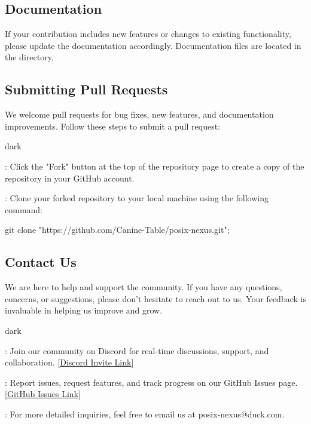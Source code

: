 \subsection{Documentation}
\label{sec:introduction:sub:document}
If your contribution includes new features or changes to existing functionality, please update the documentation accordingly.
Documentation files are located in the  directory.

\subsection{Submitting Pull Requests}
\label{sec:introduction:sub:pull}
We welcome pull requests for bug fixes, new features, and documentation improvements.
Follow these steps to submit a pull request:
\bigskip
\begin{baseBoxOne}{}{dark}
    \begin{posnexItemize}
        \item[\sA] : Click the "Fork" button at the top of the repository page to create a copy of the repository in your GitHub account.
        \item[\sA] : Clone your forked repository to your local machine using the following command:
        \begin{posnex}
    git clone "https://github.com/Canine-Table/posix-nexus.git";
        \end{posnex}
    \end{posnexItemize}
\end{baseBoxOne}
\subsection{Contact Us}
\label{sec:introduction:sub:contact}
We are here to help and support the community. If you have any questions, concerns, or suggestions, please don't hesitate to reach out to us. Your feedback is invaluable in helping us improve and grow.
\bigskip
\begin{baseBoxOne}{}{dark}
    \begin{posnexItemize}
        \item[\sA] : Join our  community on Discord for real-time discussions, support, and collaboration. [\href{https://discord.gg/GB9twwpCNM}{Discord Invite Link}]
        \item[\sA] : Report issues, request features, and track progress on our GitHub Issues page. [\href{https://github.com/Canine-Table/posix-nexus/issues}{GitHub Issues Link}]
        \item[\sA] : For more detailed inquiries, feel free to email us at posix-nexus@duck.com.
    \end{posnexItemize}
\end{baseBoxOne}
